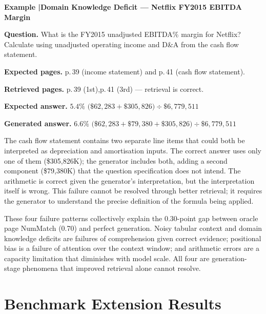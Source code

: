 \documentclass[12pt,twoside,maitrise]{dms}
\theoremstyle{definition}
\numberwithin{equation}{section}
\numberwithin{table}{chapter}
\numberwithin{figure}{chapter}
\newcounter{failex}
\newenvironment{failex}[1]{%
  \refstepcounter{failex}%
  \begin{mdframed}[
    linewidth=0.8pt,
    linecolor=black,
    innertopmargin=10pt,
    innerbottommargin=10pt,
    innerleftmargin=14pt,
    innerrightmargin=14pt,
    skipabove=\baselineskip,
    skipbelow=\baselineskip,
  ]
  \noindent\textbf{Example \thefailex\enspace|\enspace #1}
  \par\medskip
}{%
  \end{mdframed}%
}
\begin{document}
\begin{failex}{Domain Knowledge Deficit --- Netflix FY2015 EBITDA Margin}
\label{ex:domain}

\noindent\textbf{Question.}\enspace
What is the FY2015 unadjusted EBITDA\% margin for Netflix? Calculate using unadjusted
operating income and D\&A from the cash flow statement.

\medskip
\noindent\textbf{Expected pages.}\enspace
p.\,39 (income statement) and p.\,41 (cash flow statement).

\noindent\textbf{Retrieved pages.}\enspace
p.\,39 (1st),\enspace p.\,41 (3rd) --- retrieval is correct.

\medskip
\noindent\textbf{Expected answer.}\enspace
$\mathbf{5.4\%}$\enspace
$\bigl(\$62{,}283 + \$305{,}826\bigr) \div \$6{,}779{,}511$

\medskip
\noindent\textbf{Generated answer.}\enspace
$\mathbf{6.6\%}$\enspace
$\bigl(\$62{,}283 + \$79{,}380 + \$305{,}826\bigr) \div \$6{,}779{,}511$

\end{failex}

\vspace{1em}
The cash flow statement contains two separate line items that could both be interpreted
as depreciation and amortisation inputs. The correct answer uses only one of them
(\$305{,}826K); the generator includes both, adding a second component (\$79{,}380K)
that the question specification does not intend. The arithmetic is correct given the
generator's interpretation, but the interpretation itself is wrong. This failure cannot
be resolved through better retrieval; it requires the generator to understand the
precise definition of the formula being applied.

These four failure patterns collectively explain the 0.30-point gap between oracle page
NumMatch (0.70) and perfect generation. Noisy tabular context and domain knowledge
deficits are failures of comprehension given correct evidence; positional bias is a
failure of attention over the context window; and arithmetic errors are a capacity
limitation that diminishes with model scale. All four are generation-stage phenomena
that improved retrieval alone cannot resolve.

\section{Benchmark Extension Results}
\label{sec:crossdomain}
\end{document}
